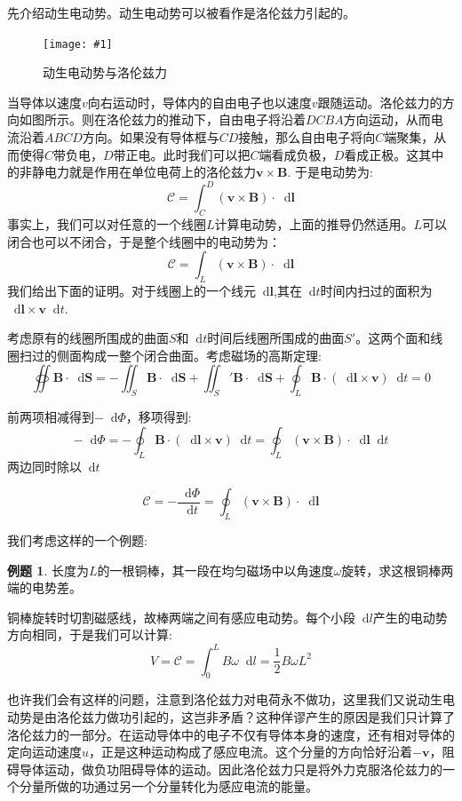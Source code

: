 \documentclass[12pt,a4paper,oneside]{report}
\theoremstyle{definition}
\newtheorem{example}{例题}[chapter]
\theoremstyle{remark}
\newcommand{\insertfig}[3]{
    \begin{figure}[ht]
        \centering
        \texttt{[image: \#1]}
        \caption{#2}
        \label{fig:#1}
    \end{figure}
}
\newcommand{\mb}[1]{\mathbf{#1}}
\renewcommand{\d}{\mathop{}\!\mathrm{d}}
\begin{document}
先介绍动生电动势。动生电动势可以被看作是洛伦兹力引起的。

\insertfig{4-1.png}{动生电动势与洛伦兹力}{0.25}

当导体以速度$v$向右运动时，导体内的自由电子也以速度$v$跟随运动。洛伦兹力的方向如图所示。则在洛伦兹力的推动下，自由电子将沿着$DCBA$方向运动，从而电流沿着$ABCD$方向。如果没有导体框与$CD$接触，那么自由电子将向$C$端聚集，从而使得$C$带负电，$D$带正电。此时我们可以把$C$端看成负极，$D$看成正极。这其中的非静电力就是作用在单位电荷上的洛伦兹力$\mathbf{v}\times\mathbf{B}$. 于是电动势为:
\[
\mathscr C = \int_C^D (\mathbf{v}\times \mathbf{B})\cdot \d \mathbf{l}
\]
事实上，我们可以对任意的一个线圈$L$计算电动势，上面的推导仍然适用。$L$可以闭合也可以不闭合，于是整个线圈中的电动势为：
\[
\mathscr C = \int_L (\mathbf{v}\times \mathbf{B})\cdot \d \mathbf{l}
\]
我们给出下面的证明。对于线圈上的一个线元$\d \mb{l}$,其在$\d t$时间内扫过的面积为$\d \mb{l} \times \mathbf{v} \d t$.

考虑原有的线圈所围成的曲面$S$和$\d t$时间后线圈所围成的曲面$S'$。这两个面和线圈扫过的侧面构成一整个闭合曲面。考虑磁场的高斯定理:
\[
\oiint \mb{B} \cdot \d \mathbf{S} =
-\iint_S \mb{B} \cdot \d \mathbf{S} +\iint_S' \mb{B} \cdot \d \mathbf{S}
+\oint_{L} \mb{B} \cdot (\d \mb{l} \times \mathbf{v}) \d t = 0
\]

前两项相减得到$-\d \Phi$，移项得到:
\[
-\d \Phi = -\oint_L \mathbf{B}\cdot (\d \mb{l}\times \mathbf{v}) \d t = \oint_L (\mathbf{v}\times \mathbf{B})\cdot \d \mathbf{l} \d t
\]
两边同时除以$\d t$

\[
\mathscr C = -\frac{\d \Phi}{\d t} =  \oint_L (\mathbf{v}\times \mathbf{B})\cdot \d \mathbf{l}
\]

我们考虑这样的一个例题:

\begin{example}
长度为$L$的一根铜棒，其一段在均匀磁场中以角速度$\omega$旋转，求这根铜棒两端的电势差。

铜棒旋转时切割磁感线，故棒两端之间有感应电动势。每个小段$\d l$产生的电动势方向相同，于是我们可以计算:
\[
V = \mathscr C = \int_0^L B\omega\d l =\frac{1}{2}B\omega L^2
\]

\end{example}
也许我们会有这样的问题，注意到洛伦兹力对电荷永不做功，这里我们又说动生电动势是由洛伦兹力做功引起的，这岂非矛盾？这种佯谬产生的原因是我们只计算了洛伦兹力的一部分。在运动导体中的电子不仅有导体本身的速度，还有相对导体的定向运动速度$u$，正是这种运动构成了感应电流。这个分量的方向恰好沿着$-\mb{v}$，阻碍导体运动，做负功阻碍导体的运动。因此洛伦兹力只是将外力克服洛伦兹力的一个分量所做的功通过另一个分量转化为感应电流的能量。
\end{document}
